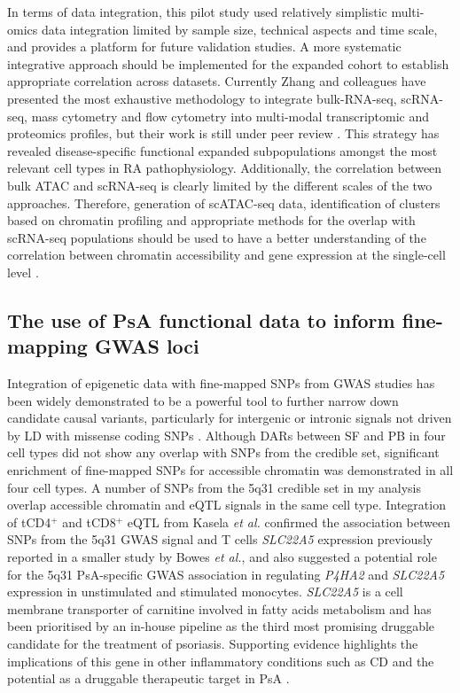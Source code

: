 In terms of data integration, this pilot study used relatively simplistic multi-omics data integration limited by sample size, technical aspects and time scale, and provides a platform for future validation studies. A more systematic integrative approach should be implemented for the expanded cohort to establish appropriate correlation across datasets. Currently Zhang and colleagues have presented the most exhaustive methodology to integrate bulk-RNA-seq, scRNA-seq, mass cytometry and flow cytometry into multi-modal transcriptomic and proteomics profiles, but their work is still under peer review \parencite{Zhang2018}. This strategy has revealed disease-specific functional expanded subpopulations amongst the most relevant cell types in RA pathophysiology. Additionally, the correlation between bulk ATAC and scRNA-seq is clearly limited by the different scales of the two approaches. Therefore, generation of scATAC-seq data, identification of clusters based on chromatin profiling and appropriate methods for the overlap with scRNA-seq populations should be used to have a better understanding of the correlation between chromatin accessibility and gene expression at the single-cell level \parencite{Duren2018}.


\subsection{The use of PsA functional data to inform fine-mapping GWAS loci}
Integration of epigenetic data with fine-mapped SNPs from GWAS studies has been widely demonstrated to be a powerful tool to further narrow down candidate causal variants, particularly for intergenic or intronic signals not driven by LD with missense coding SNPs \parencite{Bunt2015,Farh2014}. Although DARs between SF and PB in four cell types did not show any overlap with SNPs from the credible set, significant enrichment of fine-mapped SNPs for accessible chromatin was demonstrated in all four cell types. A number of SNPs from the 5q31 credible set in my analysis overlap accessible chromatin and eQTL signals in the same cell type. Integration of tCD4$^+$ and tCD8$^+$ eQTL from Kasela \textit{et al.} confirmed the association between SNPs from the 5q31 GWAS signal and T cells \textit{SLC22A5} expression previously reported in a smaller study by Bowes \textit{et al.}, and also suggested a potential role for the 5q31 PsA-specific GWAS association in regulating \textit{P4HA2} and \textit{SLC22A5} expression in unstimulated and stimulated monocytes. \textit{SLC22A5} is a cell membrane transporter of carnitine involved in fatty acids metabolism and has been prioritised by an in-house pipeline as the third most promising druggable candidate for the treatment of psoriasis. Supporting evidence highlights the implications of this gene in other inflammatory conditions such as CD and the potential as a druggable therapeutic target in PsA \parencite{Leung2006}.
 
